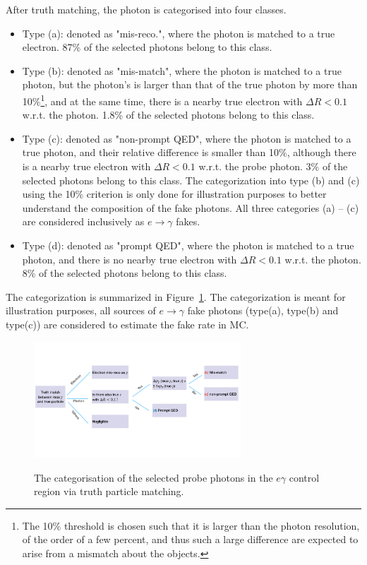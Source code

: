 After truth matching, the photon is categorised into four classes.
\begin{itemize}
\item Type (a): denoted as "mis-reco.", where the photon is matched to a true electron. 87\% of the selected photons belong to this class.
\item Type (b): denoted as "mis-match", where the photon is matched to a true photon, but the photon's \pt is larger than that of the true photon by more than 10\%\footnote{The 10\% threshold is chosen such that it is larger than the photon \pt resolution, of the order of a few percent, and thus such a large difference are expected to arise from a mismatch about the objects.}, and at the same time, there is a nearby true electron with $\Delta R < 0.1$ w.r.t. the photon. 
1.8\% of the selected photons belong to this class.
\item Type (c): denoted as "non-prompt QED", where the photon is matched to a true photon, and their relative \pt difference is smaller than 10\%, although there is a nearby true electron with $\Delta R < 0.1$ w.r.t. the probe photon. 3\% of the selected photons belong to this class. The categorization into type (b) and (c) using the 10\% criterion is only done for illustration purposes to better understand the composition of the fake photons. All three categories (a) -- (c) are considered inclusively as $e\rightarrow \gamma$ fakes. %

\item Type (d): denoted as "prompt QED", where the photon is matched to a true photon, and there is no nearby true electron with $\Delta R < 0.1$ w.r.t. the photon. 
8\% of the selected photons belong to this class. 
\end{itemize}
The categorization is summarized in Figure~\ref{fig:egammafake_classes}. The categorization is meant for illustration purposes, all sources of $e\rightarrow \gamma$ fake photons (type(a), type(b) and type(c)) are considered to estimate the fake rate in MC. 


\begin{figure}[!htbp]
\centering
{\includegraphics[width=0.69\textwidth]{figures/egammafakes/efake_truth_matching.pdf}}
\caption [] {The categorisation of the selected probe photons in the $e\gamma$ control region via truth particle matching.}
\label{fig:egammafake_classes}
\end{figure}  

